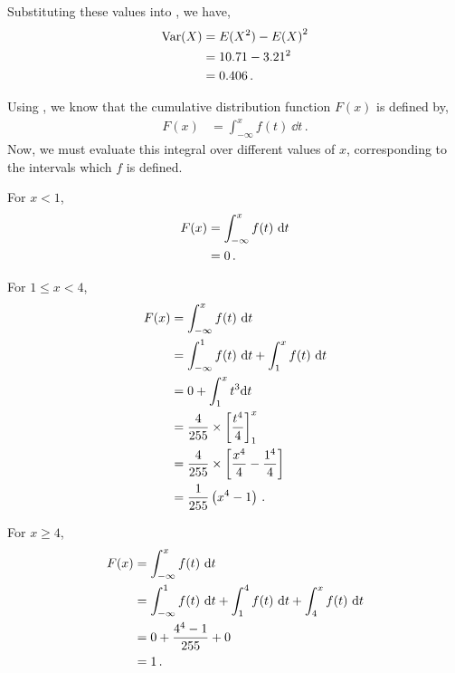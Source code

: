 \begin{subquestions}
\begin{subsubquestions}
Substituting these values into , we have,
\begin{align}
\text{Var}(X) & = E(X^2) - {E(X)}^2 \nonumber \\
	& = 10.71 - 3.21^2 \nonumber \\
	& = 0.406 \,.	
\end{align}

\end{subsubquestions}
	

\subquestion

\begin{subsubquestions}
	
\subsubquestion
Using , we know that the cumulative distribution function $F(x)$ is defined by,
\begin{align}
F(x) &= \int_{-\infty}^{x} f(t) ~\dd{t} \,.
\end{align}
Now, we must evaluate this integral over different values of $x$, corresponding to the intervals which $f$ is defined.

For $x<1$, 
\begin{align}
F(x) &=  \int_{-\infty}^{x} f(t) ~\mathrm{d}{t} \nonumber \\
&= 0 \,.
\end{align}

For $1 \leq x < 4$,
\begin{align}
F(x) &=  \int_{-\infty}^{x} f(t) ~\mathrm{d}{t} \nonumber \\
      &=  \int_{-\infty}^{1} f(t) ~\mathrm{d}{t} +  \int_{1}^{x} f(t) ~\mathrm{d}{t} \nonumber \\ 
      &= 0 + \int_1^x t^3 \mathrm{d} t \nonumber \\
      & = \frac{4}{255} \times \left[\frac{t^4}{4}\right]^x_1 \nonumber \\
      & = \frac{4}{255} \times \left[\frac{x^4}{4} - \frac{1^4}{4} \right] \nonumber \\
      & = \frac{1}{255}\left(x^4 - 1 \right) \,.
\end{align}

For $x \geq 4$,
\begin{align}
F(x) &=  \int_{-\infty}^{x} f(t) ~\mathrm{d}{t} \nonumber \\
      &= \int_{-\infty}^{1} f(t) ~\mathrm{d}{t} + \int_{1}^{4} f(t) ~\mathrm{d}{t} + \int_{4}^{x} f(t) ~\mathrm{d}{t} \nonumber \\
      &= 0 + \frac{4^4-1}{255} + 0 \nonumber \\
      &= 1 \,.
\end{align}


\end{subsubquestions}
\end{subquestions}
